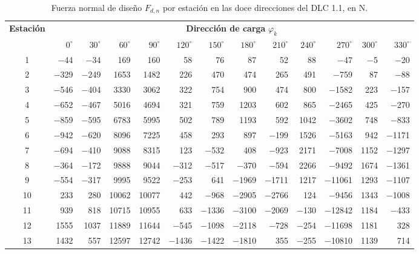 \begin{table}[H]
    \centering
    \footnotesize
    \setlength{\tabcolsep}{3.2pt}
    \caption{Fuerza normal de diseño $F_{d,n}$ por estación en las doce direcciones del DLC 1.1, en N.}
    \label{tab:anexo_dir_dlc11_n}
    \begin{tabular}{crrrrrrrrrrrr}
        \hline
        \textbf{Estación} & \multicolumn{12}{c}{\textbf{Dirección de carga} $\varphi_k$} \\
        \cline{2-13}
        & $0^\circ$ & $30^\circ$ & $60^\circ$ & $90^\circ$ & $120^\circ$ & $150^\circ$ & $180^\circ$ & $210^\circ$ & $240^\circ$ & $270^\circ$ & $300^\circ$ & $330^\circ$ \\
        \hline
        1 & $-$44 & $-$34 & 169 & 160 & 58 & 76 & 87 & 52 & 88 & $-$47 & $-$5 & $-$20 \\
        2 & $-$329 & $-$249 & 1653 & 1482 & 226 & 470 & 474 & 265 & 491 & $-$759 & 87 & $-$88 \\
        3 & $-$546 & $-$404 & 3330 & 3062 & 322 & 754 & 900 & 474 & 800 & $-$1582 & 223 & $-$157 \\
        4 & $-$652 & $-$467 & 5016 & 4694 & 321 & 759 & 1203 & 602 & 865 & $-$2465 & 425 & $-$270 \\
        5 & $-$859 & $-$595 & 6783 & 5995 & 502 & 789 & 1193 & 592 & 1042 & $-$3602 & 748 & $-$833 \\
        6 & $-$942 & $-$620 & 8096 & 7225 & 458 & 293 & 897 & $-$199 & 1526 & $-$5163 & 942 & $-$1171 \\
        7 & $-$694 & $-$410 & 9088 & 8315 & 123 & $-$532 & 408 & $-$923 & 2171 & $-$7008 & 1152 & $-$1297 \\
        8 & $-$364 & $-$172 & 9888 & 9044 & $-$312 & $-$517 & $-$370 & $-$594 & 2266 & $-$9492 & 1674 & $-$1361 \\
        9 & $-$554 & $-$317 & 9995 & 9522 & $-$253 & 641 & $-$1969 & $-$1711 & 1217 & $-$11061 & 1293 & $-$1107 \\
        10 & 233 & 280 & 10062 & 10077 & 442 & $-$968 & $-$2905 & $-$2766 & 124 & $-$9456 & 1343 & $-$1008 \\
        11 & 939 & 818 & 10715 & 10955 & 633 & $-$1336 & $-$3100 & $-$2069 & $-$130 & $-$12842 & 1184 & $-$433 \\
        12 & 1555 & 1037 & 11889 & 11644 & $-$545 & $-$1098 & $-$2118 & $-$728 & $-$254 & $-$11698 & 1181 & 328 \\
        13 & 1432 & 557 & 12597 & 12742 & $-$1436 & $-$1422 & $-$1810 & 355 & $-$255 & $-$10810 & 1139 & 714 \\

\end{tabular}
\end{table}
